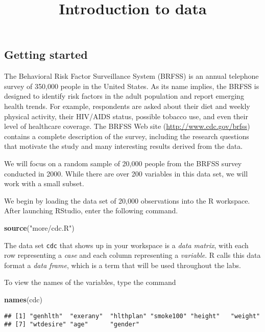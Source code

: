 \documentclass[]{article}
\title{Introduction to data}
\author{}
\date{}
\newenvironment{Shaded}{\begin{snugshade}}{\end{snugshade}}
\newcommand{\KeywordTok}[1]{\textcolor[rgb]{0.13,0.29,0.53}{\textbf{#1}}}
\newcommand{\StringTok}[1]{\textcolor[rgb]{0.31,0.60,0.02}{#1}}
\newcommand{\NormalTok}[1]{#1}
\begin{document}
\maketitle

\subsection{Getting started}\label{getting-started}

The Behavioral Risk Factor Surveillance System (BRFSS) is an annual
telephone survey of 350,000 people in the United States. As its name
implies, the BRFSS is designed to identify risk factors in the adult
population and report emerging health trends. For example, respondents
are asked about their diet and weekly physical activity, their HIV/AIDS
status, possible tobacco use, and even their level of healthcare
coverage. The BRFSS Web site (\url{http://www.cdc.gov/brfss}) contains a
complete description of the survey, including the research questions
that motivate the study and many interesting results derived from the
data.

We will focus on a random sample of 20,000 people from the BRFSS survey
conducted in 2000. While there are over 200 variables in this data set,
we will work with a small subset.

We begin by loading the data set of 20,000 observations into the R
workspace. After launching RStudio, enter the following command.

\begin{Shaded}
\begin{Highlighting}[]
\KeywordTok{source}\NormalTok{(}\StringTok{"more/cdc.R"}\NormalTok{)}
\end{Highlighting}
\end{Shaded}

The data set \texttt{cdc} that shows up in your workspace is a
\emph{data matrix}, with each row representing a \emph{case} and each
column representing a \emph{variable}. R calls this data format a
\emph{data frame}, which is a term that will be used throughout the
labs.

To view the names of the variables, type the command

\begin{Shaded}
\begin{Highlighting}[]
\KeywordTok{names}\NormalTok{(cdc)}
\end{Highlighting}
\end{Shaded}

\begin{verbatim}
## [1] "genhlth"  "exerany"  "hlthplan" "smoke100" "height"   "weight"  
## [7] "wtdesire" "age"      "gender"
\end{verbatim}
\end{document}

